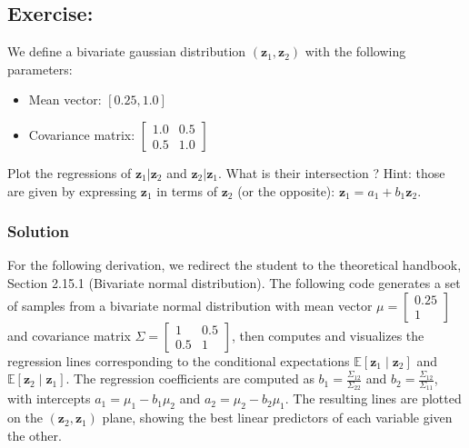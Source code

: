 \documentclass[letterpaper,10pt,english]{jupyterBook}
\begin{document}
\subsection{Exercise:}
\label{\detokenize{01:id10}}
\sphinxAtStartPar
We define a bivariate gaussian distribution \((\mathbf z_1, \mathbf z_2)\) with the following parameters:
\begin{itemize}
\item {} 
\sphinxAtStartPar
Mean vector: \([0.25, 1.0]\)

\item {} 
\sphinxAtStartPar
Covariance matrix: \(\begin{bmatrix}1.0&0.5\\0.5&1.0\end{bmatrix}\)

\end{itemize}

\sphinxAtStartPar
Plot the regressions of \(\mathbf z_1|\mathbf z_2\) and \(\mathbf z_2|\mathbf z_1\). What is their intersection ? Hint: those are given by expressing \(\mathbf z_1\) in terms of \(\mathbf z_2\) (or the opposite): \(\mathbf z_1 = a_1 + b_1\mathbf z_2\).


\subsubsection{Solution}
\label{\detokenize{01:id11}}
\sphinxAtStartPar
For the following derivation, we redirect the student to the theoretical handbook, Section 2.15.1 (Bivariate normal distribution). The following code generates a set of samples from a bivariate normal distribution with mean vector \(\mu = \begin{bmatrix} 0.25 \\ 1 \end{bmatrix}\) and covariance matrix \(\Sigma = \begin{bmatrix} 1 & 0.5 \\ 0.5 & 1 \end{bmatrix}\), then computes and visualizes the regression lines corresponding to the conditional expectations \(\mathbb{E}[\mathbf z_1 \mid \mathbf z_2]\) and \(\mathbb{E}[\mathbf z_2 \mid \mathbf z_1]\). The regression coefficients are computed as \(b_1 = \frac{\Sigma_{12}}{\Sigma_{22}}\) and \(b_2 = \frac{\Sigma_{12}}{\Sigma_{11}}\), with intercepts \(a_1 = \mu_1 - b_1 \mu_2\) and \(a_2 = \mu_2 - b_2 \mu_1\). The resulting lines are plotted on the \((\mathbf z_2, \mathbf z_1)\) plane, showing the best linear predictors of each variable given the other.
\end{document}
